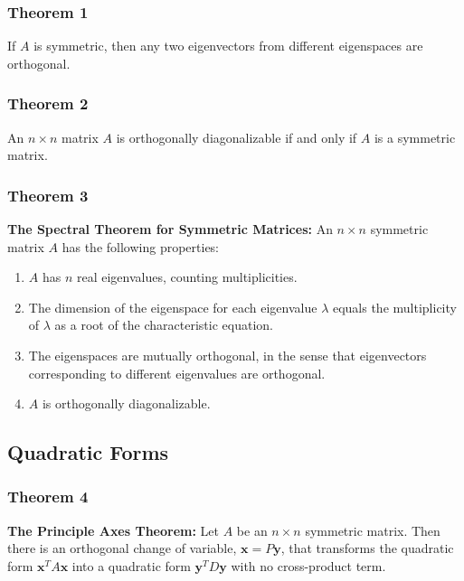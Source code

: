 \documentclass[letterpaper,11pt]{article}
\begin{document}
			\subsubsection{Theorem 1}
				If $A$ is symmetric, then any two eigenvectors from different eigenspaces are orthogonal.
			\subsubsection{Theorem 2}
				An $n\times n$ matrix $A$ is orthogonally diagonalizable if and only if $A$ is a symmetric matrix.
			\subsubsection{Theorem 3}
				\textbf{The Spectral Theorem for Symmetric Matrices:} An $n\times n$ symmetric matrix $A$ has the following properties:
				\begin{enumerate}
					\item $A$ has $n$ real eigenvalues, counting multiplicities.
					\item The dimension of the eigenspace for each eigenvalue $\lambda$ equals the multiplicity of $\lambda$ as a root of the characteristic equation.
					\item The eigenspaces are mutually orthogonal, in the sense that eigenvectors corresponding to different eigenvalues are orthogonal.
					\item $A$ is orthogonally diagonalizable.
				\end{enumerate}
		\subsection{Quadratic Forms}
			\subsubsection{Theorem 4}
				\textbf{The Principle Axes Theorem:} Let $A$ be an $n\times n$ symmetric matrix. Then there is an orthogonal change of variable, $\mathbf{x}=P\mathbf{y}$, that transforms the quadratic form $\mathbf{x}^TA\mathbf{x}$ into a quadratic form $\mathbf{y}^TD\mathbf{y}$ with no cross-product term.
\end{document}
